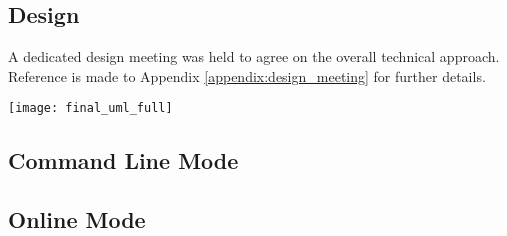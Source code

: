 \subsection{Design}

A dedicated design meeting was held to agree on the overall technical approach.
Reference is made to Appendix \ref{appendix:design_meeting} for further details.


\begin{center}
	\texttt{[image: final\_uml\_full]}
\end{center}

\subsection{Command Line Mode}

\subsection{Online Mode}
